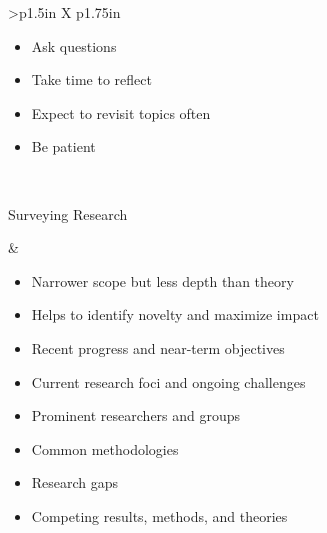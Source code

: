 \documentclass[8pt]{extarticle}
\begin{document}
\begin{tabularx}{\linewidth}{>{\bfseries}p{1.5in} X p{1.75in}}
\begin{minipage}[t]{\linewidth}
                            \begin{tipsBox}
                            \begin{itemize}[nosep,leftmargin=*]
                                \item Ask questions
                                \item Take time to reflect
                                \item Expect to revisit topics often
                                \item Be patient
                            \end{itemize}
                            \end{tipsBox}
                        \end{minipage}

                            \\

    \addlinespace %
    
    \begin{minipage}[t]{\linewidth}
        \vspace{0pt}
        Surveying Research
    \end{minipage}
  
            &   \begin{minipage}[t]{\linewidth}
                    \vspace{0pt}

                    \begin{whatBox}
                    \begin{itemize}[nosep,leftmargin=*]
                        \item Narrower scope but less depth than theory
                        \item Helps to identify novelty and maximize impact
                    \end{itemize}
                    \end{whatBox}

                    \begin{whenBox}
                    \begin{itemize}[nosep,leftmargin=*]
                        \item Recent progress and near-term objectives
                        \item Current research foci and ongoing challenges
                        \item Prominent researchers and groups
                        \item Common methodologies
                        \item Research gaps
                        \item Competing results, methods, and theories
                    \end{itemize}
                    \end{whenBox}
                \end{minipage}


\end{tabularx}
\end{document}
